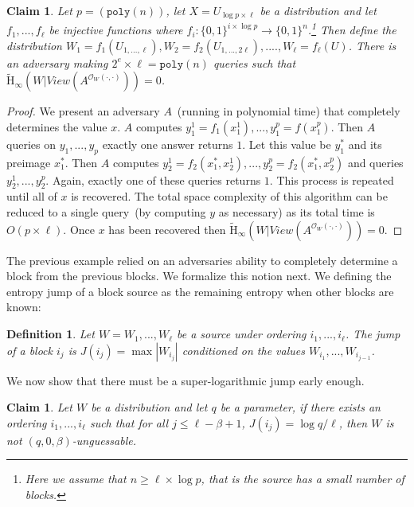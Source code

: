 \documentclass[11pt]{article}
\newcommand{\zo}{\ensuremath{\{0, 1\}}}
\newcommand{\poly}{\ensuremath{\mathtt{poly}}\xspace}
\newcommand{\Hav}{\tilde{\mathrm{H}}_\infty}
\newtheorem{definition}[theorem]{Definition}
\newtheorem{claim}[theorem]{Claim}
\begin{document}
\begin{claim}
Let $p = (\poly(n))$, let $X = U_{\log p\times \ell}$ be a distribution and let $f_1,..., f_{\ell}$ be injective functions where $f_i:\zo^{i\times \log p}\rightarrow \zo^n$.\footnote{Here we assume that $n\ge \ell \times \log p$, that is the source has a small number of blocks.}  Then define the distribution $W_1 = f_1(U_{1,...,\ell}), W_2 = f_2(U_{1,..., 2\ell}),...., W_\ell = f_\ell(U)$.  There is an adversary making $2^e\times \ell = \poly(n)$ queries such that $\Hav(W | View(A^{\mathcal{O}_W(\cdot, \cdot)})) = 0$.
\end{claim}
\begin{proof}
We present an adversary $A$~(running in polynomial time) that completely determines the value $x$.  $A$ computes $y_1^1 = f_1(x_1^1),..., y_1^p = f(x_1^p)$.  Then $A$ queries on $y_1,..., y_p$ exactly one answer returns $1$.  Let this value be $y_1^*$ and its preimage $x_1^*$.  Then $A$ computes $y_2^1 = f_2(x_1^*,x_2^1), ..., y_2^p= f_2(x_1^*, x_2^p)$ and queries $y_2^1,..., y_2^p$.  Again, exactly one of these queries returns $1$.  This process is repeated until all of $x$ is recovered.  The total space complexity of this algorithm can be reduced to a single query~(by computing $y$ as necessary) as its total time is $O(p\times \ell)$.  Once $x$ has been recovered then $\Hav(W | View(A^{\mathcal{O}_W(\cdot, \cdot)})) = 0$.
\end{proof}

The previous example relied on an adversaries ability to completely determine a block from the previous blocks.  We formalize this notion next.  We defining the entropy jump of a block source as the remaining entropy when other blocks are known:

\begin{definition}
Let $W = W_1,..., W_\ell$ be a source under ordering $i_1,..., i_\ell$.  The \emph{jump} of a block $i_j$ is $J(i_j) = \max|W_{i_j} |$ conditioned on the values $W_{i_1},..., W_{i_{j-1}}$.
\end{definition}

We now show that there must be a super-logarithmic jump early enough.

\begin{claim}
Let $W$ be a distribution and let $q$ be a parameter, if there exists an ordering $i_1,..., i_\ell$ such that for all $j\le \ell-\beta +1$, $J(i_j) = \log q /\ell$, then $W$ is not $(q, 0, \beta)$-unguessable.
\end{claim}
\end{document}
